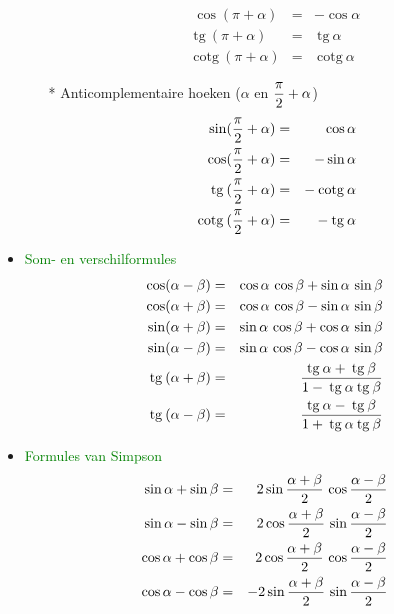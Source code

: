 \begin{itemize}
\begin{itemize}
\begin{eqnarray*}
	\cos(\pi+\alpha)&=&-\cos\alpha\\
	\mbox{tg}\:(\pi+\alpha)&=&\:\mbox{tg}\:\alpha\\
	\mbox{cotg}\:(\pi+\alpha)&=&\:\mbox{cotg}\:\alpha
	\end{eqnarray*}
	\item[*] Anticomplementaire hoeken ($\alpha$ en $\displaystyle\frac{\displaystyle \pi}{\displaystyle 2}+\alpha$)
	\begin{eqnarray*}
	\sin(\displaystyle\frac{\displaystyle \pi}{\displaystyle 2}+\alpha)& =&\cos\alpha\\
	\cos(\displaystyle\frac{\displaystyle \pi}{\displaystyle 2}+\alpha)&=&-\sin\alpha\\
	\mbox{tg}\:(\displaystyle\frac{\displaystyle \pi}{\displaystyle 2}+\alpha)&=&-\:\mbox{cotg}\:\alpha\\
	\mbox{cotg}\:(\displaystyle\frac{\displaystyle \pi}{\displaystyle 2}+\alpha)&=&-\:\mbox{tg}\:\alpha
	\end{eqnarray*}
	\end{itemize}%
\item \textcolor{green}{\hypertarget{som-en_verschilformules}{Som- en verschilformules}}\label{som-en_verschilformules}
\begin{eqnarray*}
\cos(\alpha-\beta)&=&\cos\alpha\,\cos\beta+\sin\alpha\,\sin\beta\\
\cos(\alpha+\beta)&=&\cos\alpha\,\cos\beta-\sin\alpha\,\sin\beta\\	
\sin(\alpha+\beta)&=&\sin\alpha\,\cos\beta+\cos\alpha\,\sin\beta\\
\sin(\alpha-\beta)&=&\sin\alpha\,\cos\beta-\cos\alpha\,\sin\beta\\
\mbox{tg}\:(\alpha+\beta)&=&\displaystyle\frac{\displaystyle \mbox{tg}\:\alpha+\:\mbox{tg}\:\beta}{\displaystyle 1-	\:\mbox{tg}\:\alpha\:\mbox{tg}\:\beta}\\
\mbox{tg}\:(\alpha-\beta)&=&\displaystyle\frac{\displaystyle \mbox{tg}\:\alpha-	\:\mbox{tg}\:\beta}{\displaystyle 1+	\:\mbox{tg}\:\alpha\:\mbox{tg}\:\beta}
\end{eqnarray*}
\item \textcolor{green}{\hypertarget{simpson}{Formules van Simpson}}\label{simpson}
\begin{eqnarray*}
\sin\alpha+\sin\beta&=&2\sin\displaystyle\frac{\displaystyle \alpha+\beta}{\displaystyle 2}\,\cos\displaystyle\frac{\displaystyle \alpha-\beta}{\displaystyle 2}\\
\sin\alpha-\sin\beta&=&2\cos\displaystyle\frac{\displaystyle \alpha+\beta}{\displaystyle 2}\,\sin\displaystyle\frac{\displaystyle \alpha-\beta}{\displaystyle 2}\\
\cos\alpha+\cos\beta&=&2\cos\displaystyle\frac{\displaystyle \alpha+\beta}{\displaystyle 2}\,\cos\displaystyle\frac{\displaystyle \alpha-\beta}{\displaystyle 2}\\
\cos\alpha-\cos\beta&=&-2\sin\displaystyle\frac{\displaystyle \alpha+\beta}{\displaystyle 2}\,\sin\displaystyle\frac{\displaystyle \alpha-\beta}{\displaystyle 2}\\
\end{eqnarray*}

\end{itemize}
